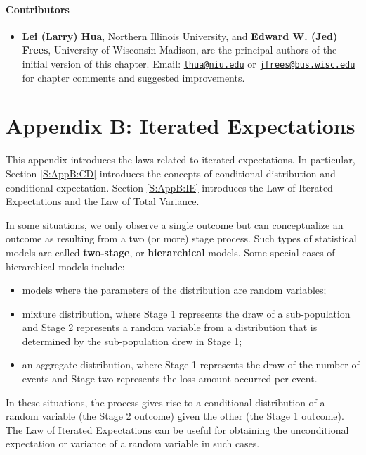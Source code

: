 \documentclass[]{book}
\providecommand{\tightlist}{%
  \setlength{\itemsep}{0pt}\setlength{\parskip}{0pt}}
\theoremstyle{definition}
\theoremstyle{definition}
\theoremstyle{definition}
\theoremstyle{remark}
\begin{document}
\subsubsection*{Contributors}\label{contributors-7}

\begin{itemize}
\tightlist
\item
  \textbf{Lei (Larry) Hua}, Northern Illinois University, and
  \textbf{Edward W. (Jed) Frees}, University of Wisconsin-Madison, are
  the principal authors of the initial version of this chapter. Email:
  \href{mailto:lhua@niu.edu}{\nolinkurl{lhua@niu.edu}} or
  \href{mailto:jfrees@bus.wisc.edu}{\nolinkurl{jfrees@bus.wisc.edu}} for
  chapter comments and suggested improvements.
\end{itemize}

\chapter{Appendix B: Iterated Expectations}\label{C:AppB}

This appendix introduces the laws related to iterated expectations. In
particular, Section \ref{S:AppB:CD} introduces the concepts of
conditional distribution and conditional expectation. Section
\ref{S:AppB:IE} introduces the Law of Iterated Expectations and the Law
of Total Variance.

In some situations, we only observe a single outcome but can
conceptualize an outcome as resulting from a two (or more) stage
process. Such types of statistical models are called \textbf{two-stage},
or \textbf{hierarchical} models. Some special cases of hierarchical
models include:

\begin{itemize}
\item
  models where the parameters of the distribution are random variables;
\item
  mixture distribution, where Stage 1 represents the draw of a
  sub-population and Stage 2 represents a random variable from a
  distribution that is determined by the sub-population drew in Stage 1;
\item
  an aggregate distribution, where Stage 1 represents the draw of the
  number of events and Stage two represents the loss amount occurred per
  event.
\end{itemize}

In these situations, the process gives rise to a conditional
distribution of a random variable (the Stage 2 outcome) given the other
(the Stage 1 outcome). The Law of Iterated Expectations can be useful
for obtaining the unconditional expectation or variance of a random
variable in such cases.
\end{document}
